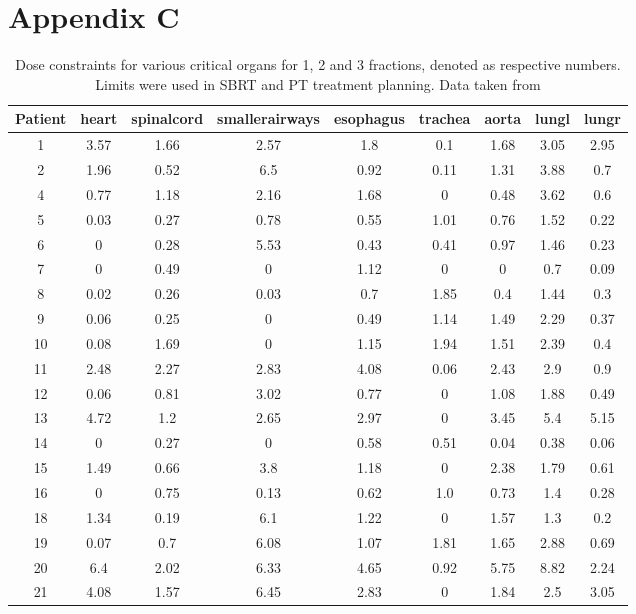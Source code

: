 \documentclass[type=dr, dr=rernat, accentcolor=tud7b,colorbacktitle, bigchapter, openright, twoside, 12pt ]{tudthesis}
\begin{document}
 
\chapter{Appendix C}

\begin{table}[H]
  \centering
  \caption{Dose constraints for various critical organs for 1, 2 and 3 fractions, denoted as respective numbers. Limits were used in SBRT and PT treatment planning. Data taken from \cite{Benedict2010}}
  \begin{tabular}{c|c|c|c|c|c|c|c|c}
 Patient  & heart & spinalcord & smallerairways & esophagus & trachea & aorta & lungl & lungr\\
 \hline \hline 
1 & 3.57 & 1.66 & 2.57 & 1.8 & 0.1 & 1.68 & 3.05 & 2.95 \\
2 & 1.96 & 0.52 & 6.5 & 0.92 & 0.11 & 1.31 & 3.88 & 0.7 \\
4 & 0.77 & 1.18 & 2.16 & 1.68 & 0 &0.48 & 3.62 & 0.6 \\
5 & 0.03 & 0.27 & 0.78 & 0.55 & 1.01 & 0.76 & 1.52 & 0.22 \\
6 & 0 &0.28 & 5.53 & 0.43 & 0.41 & 0.97 & 1.46 & 0.23 \\
7 & 0 &0.49 & 0 &1.12 & 0 &0 &0.7 & 0.09 \\
8 & 0.02 & 0.26 & 0.03 & 0.7 & 1.85 & 0.4 & 1.44 & 0.3 \\
9 & 0.06 & 0.25 & 0 &0.49 & 1.14 & 1.49 & 2.29 & 0.37 \\
10 & 0.08 & 1.69 & 0 &1.15 & 1.94 & 1.51 & 2.39 & 0.4 \\
11 & 2.48 & 2.27 & 2.83 & 4.08 & 0.06 & 2.43 & 2.9 & 0.9 \\
12 & 0.06 & 0.81 & 3.02 & 0.77 & 0 &1.08 & 1.88 & 0.49 \\
13 & 4.72 & 1.2 & 2.65 & 2.97 & 0 &3.45 & 5.4 & 5.15 \\
14 & 0 &0.27 & 0 &0.58 & 0.51 & 0.04 & 0.38 & 0.06 \\
15 & 1.49 & 0.66 & 3.8 & 1.18 & 0 &2.38 & 1.79 & 0.61 \\
16 & 0 &0.75 & 0.13 & 0.62 & 1.0 & 0.73 & 1.4 & 0.28 \\
18 & 1.34 & 0.19 & 6.1 & 1.22 & 0 &1.57 & 1.3 & 0.2 \\
19 & 0.07 & 0.7 & 6.08 & 1.07 & 1.81 & 1.65 & 2.88 & 0.69 \\
20 & 6.4 & 2.02 & 6.33 & 4.65 & 0.92 & 5.75 & 8.82 & 2.24 \\
21 & 4.08 & 1.57 & 6.45 & 2.83 & 0 &1.84 & 2.5 & 3.05 \\
\hline\hline
  
  \end{tabular}
  \label{tab:oarlimits}
\end{table}
\end{document}
